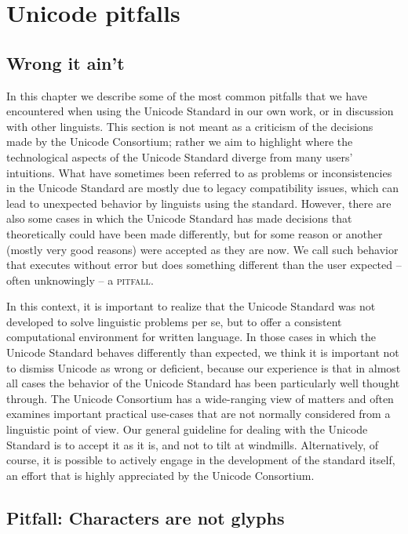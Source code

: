 \chapter{Unicode pitfalls}
\label{unicode-pitfalls}

\section{Wrong it ain't}
\label{wrong-it-is-not}

In this chapter we describe some of the most common pitfalls that we have
encountered when using the Unicode Standard in our own work, or in discussion
with other linguists. This section is not meant as a criticism of the decisions
made by the Unicode Consortium; rather we aim to highlight where the
technological aspects of the Unicode Standard diverge from many users'
intuitions. What have sometimes been referred to as problems or inconsistencies
in the Unicode Standard are mostly due to legacy compatibility issues, which can
lead to unexpected behavior by linguists using the standard. However, there are
also some cases in which the Unicode Standard has made decisions that
theoretically could have been made differently, but for some reason or another
(mostly very good reasons) were accepted as they are now. We call such behavior that
executes without error but does something different than the user
expected -- often unknowingly -- a \textsc{pitfall}.

In this context, it is important to realize that the Unicode Standard was not
developed to solve linguistic problems per se, but to offer a consistent
computational environment for written language. In those cases in which the
Unicode Standard behaves differently than expected, we think it is important not
to dismiss Unicode as wrong or deficient, because our
experience is that in almost all cases the behavior of the Unicode Standard has
been particularly well thought through. The Unicode Consortium has a 
wide-ranging view of matters and often examines important practical use-cases
that are not normally considered from a linguistic point of view. Our general
guideline for dealing with the Unicode Standard is to accept it as it is, and
not to tilt at windmills. Alternatively, of course, it is possible to actively
engage in the development of the standard itself, an effort that is highly
appreciated by the Unicode Consortium.

\section{Pitfall: Characters are not glyphs}
\label{pitfall-characters-are-not-glyphs}

